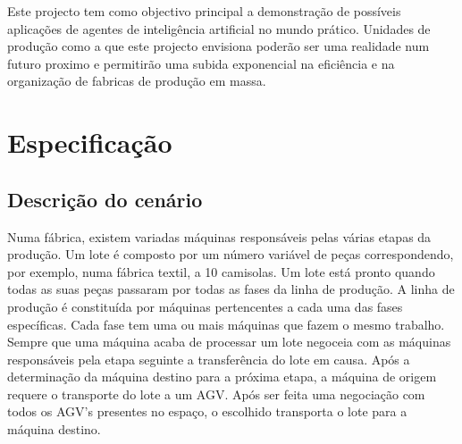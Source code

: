 \begin{titlepage}
Este projecto tem como objectivo principal a demonstração de possíveis aplicações de agentes de inteligência artificial no mundo prático. Unidades de produção como a que este projecto envisiona poderão ser uma realidade num futuro proximo e permitirão uma subida exponencial na eficiência e na organização de fabricas de produção em massa.


\newpage %


\section{Especificação}

\subsection{Descrição do cenário}
Numa fábrica, existem variadas máquinas responsáveis pelas várias etapas da produção. Um lote é composto por um número variável de peças correspondendo, por exemplo, numa fábrica textil, a 10 camisolas. Um lote está pronto quando todas as suas peças passaram por todas as fases da linha de produção. A linha de produção é constituída por máquinas pertencentes a cada uma das fases específicas. Cada fase tem uma ou mais máquinas que fazem o mesmo trabalho. Sempre que uma máquina acaba de processar um lote negoceia com as máquinas responsáveis pela etapa seguinte a transferência do lote em causa. Após a determinação da máquina destino para a próxima etapa, a máquina de origem requere o transporte do lote a um AGV. Após ser feita uma negociação com todos os AGV's presentes no espaço, o escolhido transporta o lote para a máquina destino.


\end{titlepage}
